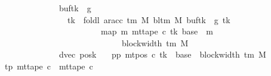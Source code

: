 \begin{isabellebody}
\ \ \ \ \ \ \ \ \ \ \ \ \ \ \ \ {\isacharparenleft}{\kern0pt}buf{\isacharparenleft}{\kern0pt}tk\ {\isacharcolon}{\kern0pt}{\isacharequal}{\kern0pt}\ {\isacharquery}{\kern0pt}g{}{\isacharparenright}{\kern0pt}{\isacharparenright}{\kern0pt}\isanewline
\ \ \ \ \ \ \ \ \ \ \ \ \ \ \ \ \ \ {\isacharparenleft}{\kern0pt}tk\ {\isacharcolon}{\kern0pt}{\isacharequal}{\kern0pt}\ foldl\ {\isacharparenleft}{\kern0pt}ar{\isacharunderscore}{\kern0pt}acc\ {\isacharparenleft}{\kern0pt}{\isasymGamma}{\isacharunderscore}{\kern0pt}tm\ M{\isacharparenright}{\kern0pt}\ {\isacharparenleft}{\kern0pt}bl{\isacharunderscore}{\kern0pt}tm\ M{\isacharparenright}{\kern0pt}{\isacharparenright}{\kern0pt}\ {\isacharparenleft}{\kern0pt}{\isacharparenleft}{\kern0pt}buf{\isacharparenleft}{\kern0pt}tk\ {\isacharcolon}{\kern0pt}{\isacharequal}{\kern0pt}\ {\isacharquery}{\kern0pt}g{}{\isacharparenright}{\kern0pt}{\isacharparenright}{\kern0pt}\ tk{\isacharparenright}{\kern0pt}\isanewline
\ \ \ \ \ \ \ \ \ \ \ \ \ \ \ \ \ \ \ \ \ \ \ \ \ \ {\isacharparenleft}{\kern0pt}map\ {\isacharparenleft}{\kern0pt}{\isasymlambda}m{\isachardot}{\kern0pt}\ mt{\isacharunderscore}{\kern0pt}tape\ c{}\ tk\ {\isacharparenleft}{\kern0pt}base\ {\isacharplus}{\kern0pt}\ m{\isacharparenright}{\kern0pt}{\isacharparenright}{\kern0pt}\isanewline
\ \ \ \ \ \ \ \ \ \ \ \ \ \ \ \ \ \ \ \ \ \ \ \ \ \ \ \ \ \ \ {\isacharbrackleft}{\kern0pt}{}{\isachardot}{\kern0pt}{\isachardot}{\kern0pt}{\isacharless}{\kern0pt}block{\isacharunderscore}{\kern0pt}width\ {\isacharparenleft}{\kern0pt}{\isasymGamma}{\isacharunderscore}{\kern0pt}tm\ M{\isacharparenright}{\kern0pt}\ {\isacharminus}{\kern0pt}\ {}{\isacharbrackright}{\kern0pt}{\isacharparenright}{\kern0pt}{\isacharparenright}{\kern0pt}{\isacharcomma}{\kern0pt}\isanewline
\ \ \ \ \ \ \ \ \ \ \ \ \ \ \ \ dvec{\isacharcomma}{\kern0pt}\ {\isacharquery}{\kern0pt}posk{\isacharprime}{\kern0pt}{\isacharparenright}{\kern0pt}{\isachardoublequoteclose}\isanewline
\ \ \ pp{}{\isacharcolon}{\kern0pt}\ {\isachardoublequoteopen}mt{\isacharunderscore}{\kern0pt}pos\ c{}\ tk\ {\isacharequal}{\kern0pt}\ base\ {\isacharplus}{\kern0pt}\ {\isacharparenleft}{\kern0pt}block{\isacharunderscore}{\kern0pt}width\ {\isacharparenleft}{\kern0pt}{\isasymGamma}{\isacharunderscore}{\kern0pt}tm\ M{\isacharparenright}{\kern0pt}\ {\isacharminus}{\kern0pt}\ {}{\isacharparenright}{\kern0pt}{\isachardoublequoteclose}\isanewline
\ \ \ tp{}{\isacharcolon}{\kern0pt}\ {\isachardoublequoteopen}mt{\isacharunderscore}{\kern0pt}tape\ c{}\ {\isacharequal}{\kern0pt}\ mt{\isacharunderscore}{\kern0pt}tape\ c{}{\isachardoublequoteclose}\isanewline

\end{isabellebody}
